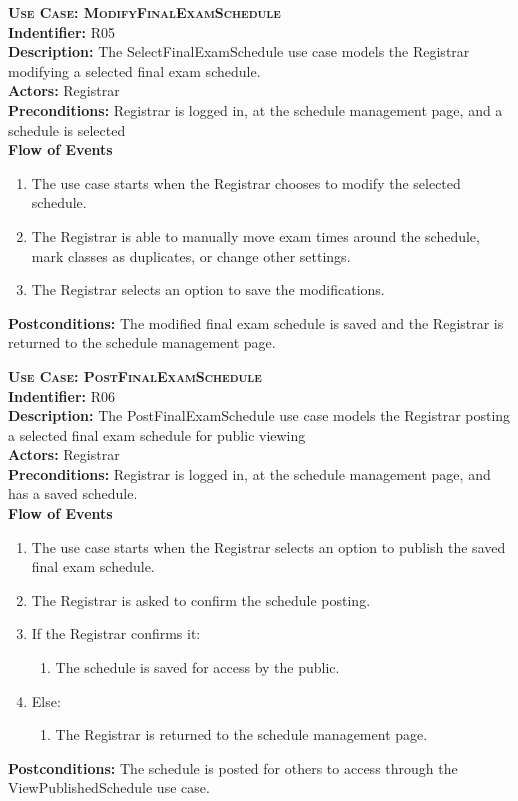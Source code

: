 \documentclass[11pt]{article}
\newcounter{id}
\newenvironment{usecase}{%
	\def\title##1{ {\large \bfseries  \scshape {Use Case:} ##1} \\ }
 	\def\id##1{{\bf Indentifier:} ##1\\}
	\def\des##1{ {\bf Description:} ##1\\}
	\def\actors##1{ {\bf Actors:} ##1\\}
    	\def\pre##1{ {\bf Preconditions:} ##1 \\} %
    	\def\flow##1{ {\bf Flow of Events} ##1}%
    	\newenvironment{ucenum}{%
        	\begin{enumerate}[nolistsep]\small}%
        	{\end{enumerate}}
	\def\post##1{ {\bf Postconditions:} ##1 \\}
}{\vspace{.05in}}
\begin{document}
\begin{usecase}
  \title{ModifyFinalExamSchedule}
  \id{R05}
  \des{The SelectFinalExamSchedule use case models the Registrar modifying a selected final exam schedule.}
  \actors{Registrar}
  \pre{Registrar is logged in, at the schedule management page, and a schedule is selected}
  \flow{}
  \begin{ucenum}
  \item The use case starts when the Registrar chooses to modify the selected schedule.
  \item The Registrar is able to manually move exam times around the schedule, mark classes as duplicates, or change other settings.
  \item The Registrar selects an option to save the modifications.
  \end{ucenum}
  \post{The modified final exam schedule is saved and the Registrar is returned to the schedule management page.}
\end{usecase}

\begin{usecase}
  \title{PostFinalExamSchedule}
  \id{R06}
  \des{The PostFinalExamSchedule use case models the Registrar posting a selected final exam schedule for public viewing}
  \actors{Registrar}
  \pre{Registrar is logged in, at the schedule management page, and has a saved schedule.}
  \flow{}
  \begin{ucenum}
  \item The use case starts when the Registrar selects an option to publish the saved final exam schedule.
  \item The Registrar is asked to confirm the schedule posting.
  \item If the Registrar confirms it:
    \begin{ucenum} \item The schedule is saved for access by the public. \end{ucenum}
  \item Else:
    \begin{ucenum} \item The Registrar is returned to the schedule management page. \end{ucenum}
  \end{ucenum}
  \post{The schedule is posted for others to access through the ViewPublishedSchedule use case.}
\end{usecase}
\end{document}
